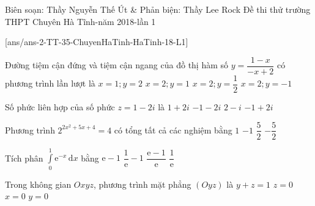 \begin{name}
{Biên soạn: Thầy Nguyễn Thế Út \& Phản biện: Thầy Lee Rock}
{Đề thi thử trường THPT Chuyên Hà Tĩnh-năm 2018-lần 1}
\end{name}
\setcounter{ex}{0}\setcounter{bt}{0}
[ans/ans-2-TT-35-ChuyenHaTinh-HaTinh-18-L1]
\begin{ex}%
Đường tiệm cận đứng và tiệm cận ngang của đồ thị hàm số $y=\dfrac{1-x}{-x+2}$ có phương trình lần lượt là 
\choice
{$x=1;y=2$}
{\True $x=2;y=1$}
{$x=2;y=\dfrac{1}{2}$}
{$x=2;y=-1$}
\end{ex}

\begin{ex}%
Số phức liên hợp của số phức $z=1-2i$ là
\choice
{\True $1+2i$}
{$-1-2i$}
{$2-i$}
{$-1+2i$}
\end{ex}

\begin{ex}%
Phương trình $2^{2x^2+5x+4}=4$ có tổng tất cả các nghiệm bằng
\choice
{$1$}
{$-1$}
{$\dfrac{5}{2}$}
{\True $-\dfrac{5}{2}$}
\end{ex}

\begin{ex}%
Tích phân $\displaystyle\int\limits_0^1 \mathrm{e}^{-x}\mathrm{\,d}x$ bằng
\choice
{$\mathrm{e}-1$}
{$\dfrac{1}{\mathrm{e}}-1$}
{\True $\dfrac{\mathrm{e}-1}{\mathrm{e}}$}
{$\dfrac{1}{\mathrm{e}}$}
\end{ex}

\begin{ex}%
Trong không gian $Oxyz$, phương trình mặt phẳng $(Oyz)$ là
\choice
{$y+z=1$}
{$z=0$}
{\True $x=0$}
{$y=0$}
\end{ex}

